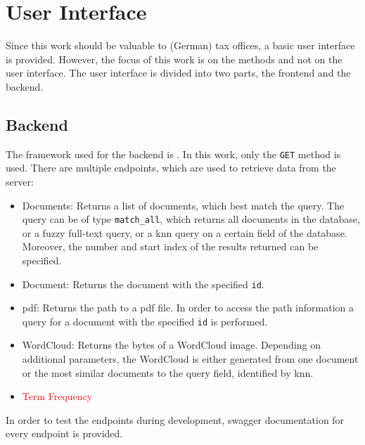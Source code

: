 \section{User Interface}\label{sec:ui}

Since this work should be valuable to (German) tax offices, a basic user interface is provided.
However, the focus of this work is on the methods and not on the user interface.
The user interface is divided into two parts, the frontend and the backend.

\subsection{Backend}\label{subsec:backend}

The framework used for the backend is \flask{}.
In this work, only the \texttt{GET} method is used.
There are multiple endpoints, which are used to retrieve data from the server:

\begin{itemize}
    \item \label{pt:docs}Documents: 
        Returns a list of documents, which best match the query.
        The query can be of type \texttt{match\_all}, which returns all documents in the database, 
        or a fuzzy full-text query, 
        or a \ac{knn} query on a certain field of the database.
        Moreover, the number and start index of the results returned can be specified.

    \item \label{pt:doc}Document: 
        Returns the document with the specified \texttt{id}.

    \item \label{pt:pdf}\ac{pdf}: 
        Returns the path to a \ac{pdf} file.
        In order to access the path information a query for a document with the specified \texttt{id} is performed.
    
    \item \label{pt:wordcloud}WordCloud: 
        Returns the bytes of a WordCloud image. 
        Depending on additional parameters, the WordCloud is either generated from one document or 
        the most similar documents to the query field, identified by \ac{knn}.

    \item \label{pt:termfrequency}\textcolor{red}{Term Frequency}
\end{itemize}

In order to test the endpoints during development, swagger documentation for every endpoint is provided.





